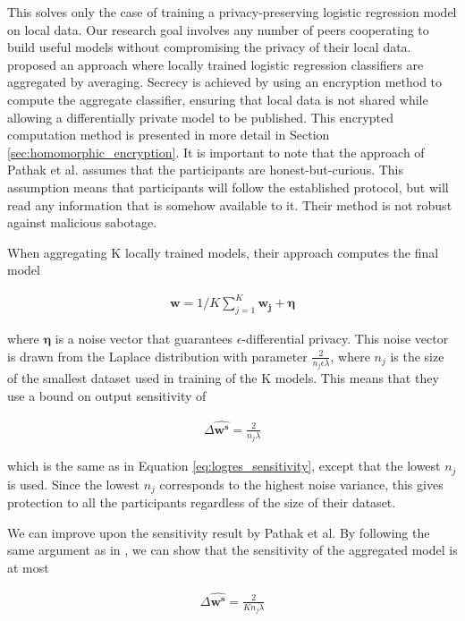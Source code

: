 This solves only the case of training a privacy-preserving logistic regression model on local data. Our research goal involves any number of peers cooperating to build useful models without compromising the privacy of their local data. \cite{pathak2010diffprivhomo} proposed an approach where locally trained logistic regression classifiers are aggregated by averaging. Secrecy is achieved by using an encryption method to compute the aggregate classifier, ensuring that local data is not shared while allowing a differentially private model to be published. This encrypted computation method is presented in more detail in Section \ref{sec:homomorphic_encryption}. It is important to note that the approach of Pathak et al. assumes that the participants are honest-but-curious. This assumption means that participants will follow the established protocol, but will read any information that is somehow available to it. Their method is not robust against malicious sabotage. 

When aggregating K locally trained models, their approach computes the final model

\begin{eqnarray}
\label{eq:parametric_aggregation}
\boldsymbol{w} = 1/K\sum_{j=1}^{K} \boldsymbol{w_j} + \boldsymbol{\eta}
\end{eqnarray}


where $\boldsymbol{\eta}$ is a noise vector that guarantees $\epsilon$-differential privacy. This noise vector is drawn from the Laplace distribution with parameter $\frac{2}{n_j\epsilon\lambda}$, where $n_j$ is the size of the smallest dataset used in training of the K models. This means that they use a bound on output sensitivity of 

\begin{eqnarray}
\label{eq:aggregated_logistic_sensitivity}
\Delta\boldsymbol{\hat{w^s}} = \frac{2}{n_j\lambda}
\end{eqnarray}


which is the same as in Equation \ref{eq:logres_sensitivity}, except that the lowest $n_j$ is used. Since the lowest $n_j$ corresponds to the highest noise variance, this gives protection to all the participants regardless of the size of their dataset.

We can improve upon the sensitivity result by Pathak et al. By following the same argument as in \cite{pathak2010diffprivhomo}, we can show that the sensitivity of the aggregated model is at most 

\begin{eqnarray}
\label{eq:aggregated_logistic_sensitivity_stronger}
\Delta\boldsymbol{\hat{w^s}} = \frac{2}{K n_j	\lambda}
\end{eqnarray}

